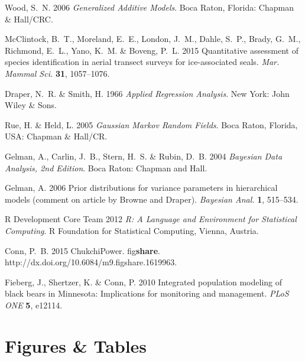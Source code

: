 \documentclass[]{rsos}%
\begin{document}
\begin{thebibliography}{10}
Wood, S.~N. 2006 \emph{Generalized Additive Models}.
 Boca Raton, Florida: Chapman \& Hall/CRC.

McClintock, B.~T., Moreland, E.~E., London, J.~M., Dahle, S.~P., Brady, G.~M.,
  Richmond, E.~L., Yano, K.~M. \& Boveng, P.~L. 2015 Quantitative assessment
  of species identification in aerial transect surveys for ice-associated
  seals.
 \emph{Mar. Mammal Sci.} \textbf{31}, 1057--1076.

Draper, N.~R. \& Smith, H. 1966 \emph{Applied Regression Analysis}.
 New York: John Wiley \& Sons.

Rue, H. \& Held, L. 2005 \emph{Gaussian Markov Random Fields}.
 Boca Raton, Florida, USA: Chapman \& Hall/CR.

Gelman, A., Carlin, J.~B., Stern, H.~S. \& Rubin, D.~B. 2004 \emph{Bayesian
  Data Analysis, 2nd Edition}.
 Boca Raton: Chapman and Hall.

Gelman, A. 2006 Prior distributions for variance parameters in hierarchical
  models (comment on article by {B}rowne and {D}raper).
 \emph{Bayesian Anal.} \textbf{1}, 515--534.

{R Development Core Team} 2012 \emph{R: A Language and Environment for
  Statistical Computing}.
 R Foundation for Statistical Computing, Vienna, Austria.

Conn, P.~B. 2015
 Chukchi{P}ower.
 fig\textbf{share}.
 {h}ttp://dx.doi.org/10.6084/m9.figshare.1619963.

Fieberg, J., Shertzer, K. \& Conn, P. 2010 Integrated population modeling of
  black bears in {M}innesota: Implications for monitoring and management.
 \emph{PLoS ONE} \textbf{5}, e12114.

\end{thebibliography}

\section{Figures \& Tables}
\end{document}
